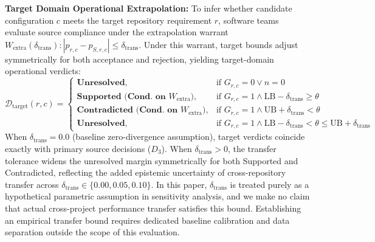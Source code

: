\documentclass[runningheads]{llncs}
\begin{document}
\textbf{Target Domain Operational Extrapolation:} To infer whether candidate configuration $c$ meets the target repository requirement $r$, software teams evaluate source compliance under the extrapolation warrant $W_{\text{extra}}(\delta_{\text{trans}}): |p_{r,c} - p_{S,r,c}| \le \delta_{\text{trans}}$. Under this warrant, target bounds adjust symmetrically for both acceptance and rejection, yielding target-domain operational verdicts:
\begin{equation}
\label{eq:target_decision}
\mathcal{D}_{\text{target}}(r, c) = \begin{cases}
\textbf{Unresolved}, & \text{if } G_{r,c} = 0 \lor n = 0 \\
\textbf{Supported (Cond.\ on } W_{\text{extra}}\textbf{)}, & \text{if } G_{r,c} = 1 \land \text{LB} - \delta_{\text{trans}} \ge \theta \\
\textbf{Contradicted (Cond.\ on } W_{\text{extra}}\textbf{)}, & \text{if } G_{r,c} = 1 \land \text{UB} + \delta_{\text{trans}} < \theta \\
\textbf{Unresolved}, & \text{if } G_{r,c} = 1 \land \text{LB} - \delta_{\text{trans}} < \theta \le \text{UB} + \delta_{\text{trans}}
\end{cases}
\end{equation}
When $\delta_{\text{trans}} = 0.0$ (baseline zero-divergence assumption), target verdicts coincide exactly with primary source decisions ($D_3$). When $\delta_{\text{trans}} > 0$, the transfer tolerance widens the unresolved margin symmetrically for both Supported and Contradicted, reflecting the added epistemic uncertainty of cross-repository transfer across $\delta_{\text{trans}} \in \{0.00, 0.05, 0.10\}$. In this paper, $\delta_{\text{trans}}$ is treated purely as a hypothetical parametric assumption in sensitivity analysis, and we make no claim that actual cross-project performance transfer satisfies this bound. Establishing an empirical transfer bound requires dedicated baseline calibration and data separation outside the scope of this evaluation.
\end{document}
